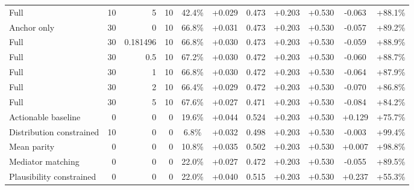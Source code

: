 \begin{table}[htbp]
\begin{tabular}{lrrrccccccc}
Full & 10 & 5 & 10 & 42.4\% & +0.029 & 0.473 & +0.203 & +0.530 & -0.063 & +88.1\% \\
Anchor only & 30 & 0 & 10 & 66.8\% & +0.031 & 0.473 & +0.203 & +0.530 & -0.057 & +89.2\% \\
Full & 30 & 0.181496 & 10 & 66.8\% & +0.030 & 0.473 & +0.203 & +0.530 & -0.059 & +88.9\% \\
Full & 30 & 0.5 & 10 & 67.2\% & +0.030 & 0.472 & +0.203 & +0.530 & -0.060 & +88.7\% \\
Full & 30 & 1 & 10 & 66.8\% & +0.030 & 0.472 & +0.203 & +0.530 & -0.064 & +87.9\% \\
Full & 30 & 2 & 10 & 66.4\% & +0.029 & 0.472 & +0.203 & +0.530 & -0.070 & +86.8\% \\
Full & 30 & 5 & 10 & 67.6\% & +0.027 & 0.471 & +0.203 & +0.530 & -0.084 & +84.2\% \\
Actionable baseline & 0 & 0 & 0 & 19.6\% & +0.044 & 0.524 & +0.203 & +0.530 & +0.129 & +75.7\% \\
Distribution constrained & 10 & 0 & 0 & 6.8\% & +0.032 & 0.498 & +0.203 & +0.530 & -0.003 & +99.4\% \\
Mean parity & 0 & 0 & 0 & 10.8\% & +0.035 & 0.502 & +0.203 & +0.530 & +0.007 & +98.8\% \\
Mediator matching & 0 & 0 & 0 & 22.0\% & +0.027 & 0.472 & +0.203 & +0.530 & -0.055 & +89.5\% \\
Plausibility constrained & 0 & 0 & 0 & 22.0\% & +0.040 & 0.515 & +0.203 & +0.530 & +0.237 & +55.3\% \\
\bottomrule
\end{tabular}
\end{table}